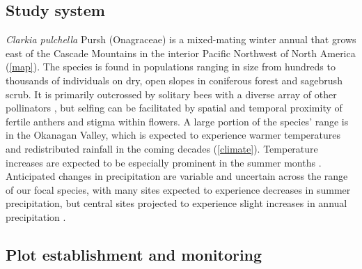 \documentclass{article}
\begin{document}
\subsection*{Study system}
\textit{Clarkia pulchella} Pursh (Onagraceae) is a mixed-mating winter annual that grows east of the Cascade Mountains in the interior Pacific Northwest of North America (\autoref{map}). The species is found in populations ranging in size from hundreds to thousands of individuals on dry, open slopes in coniferous forest and sagebrush scrub. It is primarily outcrossed by solitary bees \citep{palladini2013indirect} with a diverse array of other pollinators \citep{macswain1973comparative}, but selfing can be facilitated by spatial and temporal proximity of fertile anthers and stigma within flowers. A large portion of the species' range is in the Okanagan Valley, which is expected to experience warmer temperatures and redistributed rainfall in the coming decades (\autoref{climate}). Temperature increases are expected to be especially prominent in the summer months \citep{wang2012climatewna, ipcc2014}. Anticipated changes in precipitation are variable and uncertain across the range of our focal species, with many sites expected to experience decreases in summer precipitation, but central sites projected to experience slight increases in annual precipitation \citep{wang2012climatewna, ipcc2014}.

\subsection*{Plot establishment and monitoring}
\end{document}
